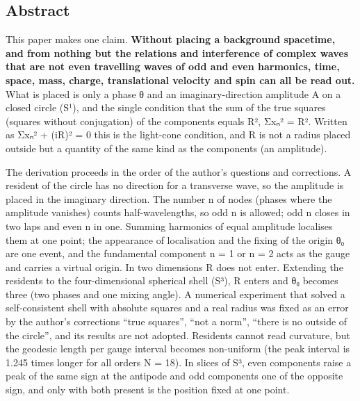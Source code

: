 \documentclass[
  a4paper,
]{article}
\begin{document}
\subsection{Abstract}\label{abstract}

This paper makes one claim. \textbf{Without placing a background
spacetime, and from nothing but the relations and interference of
complex waves that are not even travelling waves of odd and even
harmonics, time, space, mass, charge, translational velocity and spin
can all be read out.} What is placed is only a phase θ and an
imaginary-direction amplitude A on a closed circle (S¹), and the single
condition that the sum of the true squares (squares without conjugation)
of the components equals R², Σxₙ² = R². Written as Σxₙ² + (iR)² = 0 this
is the light-cone condition, and R is not a radius placed outside but a
quantity of the same kind as the components (an amplitude).

The derivation proceeds in the order of the author's questions and
corrections. A resident of the circle has no direction for a transverse
wave, so the amplitude is placed in the imaginary direction. The number
n of nodes (phases where the amplitude vanishes) counts
half-wavelengths, so odd n is allowed; odd n closes in two laps and even
n in one. Summing harmonics of equal amplitude localises them at one
point; the appearance of localisation and the fixing of the origin θ₀
are one event, and the fundamental component n = 1 or n = 2 acts as the
gauge and carries a virtual origin. In two dimensions R does not enter.
Extending the residents to the four-dimensional spherical shell (S³), R
enters and θ₀ becomes three (two phases and one mixing angle). A
numerical experiment that solved a self-consistent shell with absolute
squares and a real radius was fixed as an error by the author's
corrections ``true squares'', ``not a norm'', ``there is no outside of
the circle'', and its results are not adopted. Residents cannot read
curvature, but the geodesic length per gauge interval becomes
non-uniform (the peak interval is 1.245 times longer for all orders N =
18). In slices of S³, even components raise a peak of the same sign at
the antipode and odd components one of the opposite sign, and only with
both present is the position fixed at one point.
\end{document}

